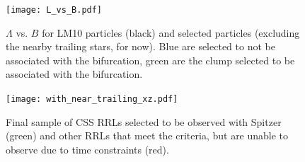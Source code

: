 \documentclass[letterpaper,12pt,preprint]{aastex}
\begin{document}
\begin{figure}
\begin{center}
\texttt{[image: L\_vs\_B.pdf]}
\caption{ $\Lambda$ vs. $B$ for LM10 particles (black) and selected particles (excluding the nearby trailing stars, for now). Blue are selected to not be associated with the bifurcation, green are the clump selected to be associated with the bifurcation. }\label{fig:LB}
\end{center}
\end{figure}


\begin{figure}
\begin{center}
\texttt{[image: with\_near\_trailing\_xz.pdf]}
\caption{ Final sample of CSS RRLs selected to be observed with Spitzer (green) and other RRLs that meet the criteria, but are unable to observe due to time constraints (red). }\label{fig:final_sample}
\end{center}
\end{figure}
\end{document}
